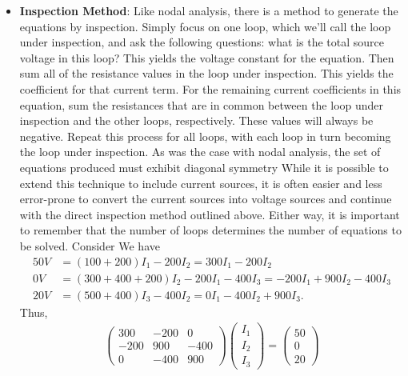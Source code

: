 \documentclass{report}
\begin{document}
\begin{itemize}
\begin{align*}
            .\end{align*}
            Similarly, 
            \begin{align*}
                V_{bc} = (I_{3} - I_{2})5000 = 774mV
            .\end{align*}
        \item \textbf{Inspection Method}: Like nodal analysis, there is a method to generate the equations by inspection. Simply focus on one loop, which we'll call the loop under inspection, and ask the following questions: what is the total source voltage in this loop? This yields the voltage constant for the equation. Then sum all of the resistance values in the loop under inspection. This yields the coefficient for that current term. For the remaining current coefficients in this equation, sum the resistances that are in common between the loop under inspection and the other loops, respectively. These values will always be negative. Repeat this process for all loops, with each loop in turn becoming the loop under inspection. As was the case with nodal analysis, the set of equations produced must exhibit diagonal symmetry
            \bigbreak \noindent 
            While it is possible to extend this technique to include current sources, it is often easier and less error-prone to convert the current sources into voltage sources and continue with the direct inspection method outlined above. Either way, it is important to remember that the number of loops determines the number of equations to be solved.
            \bigbreak \noindent 
            Consider
            \bigbreak \noindent 
            \bigbreak \noindent 
            We have
            \begin{align*}
                50V &= (100 + 200)I_{1} - 200I_{2} = 300I_{1} - 200I_{2} \\
                0V &= (300 + 400 + 200)I_{2} - 200I_{1} - 400I_{3} = - 200I_{1} + 900I_{2}  - 400I_{3} \\
                20V &= (500 + 400)I_{3} - 400I_{2} = 0I_{1} - 400I_{2} + 900 I_{3}
            .\end{align*}
            Thus,
            \begin{align*}
                \begin{pmatrix} 300 & -200 & 0 \\ -200 & 900 & -400 \\ 0 & -400 & 900 \end{pmatrix}\begin{pmatrix} I_{1} \\ I_{2} \\ I_{3} \end{pmatrix} = \begin{pmatrix} 50 \\ 0 \\ 20 \end{pmatrix}

\end{align*}
\end{itemize}
\end{document}
